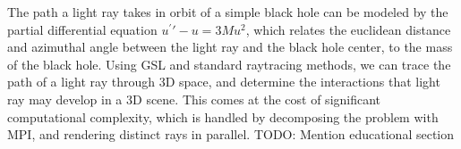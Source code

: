 The path a light ray takes in orbit of a simple black hole can be modeled by
the partial differential equation $u^\prime\prime - u = 3Mu^2$, which relates
the euclidean distance and azimuthal angle between the light ray and the black
hole center, to the mass of the black hole.
Using GSL and standard raytracing methods, we can trace the path of a light ray
through 3D space, and determine the interactions that light ray may develop in a 3D scene.
This comes at the cost of significant computational complexity, which is handled by decomposing
the problem with MPI, and rendering distinct rays in parallel. TODO: Mention educational section

